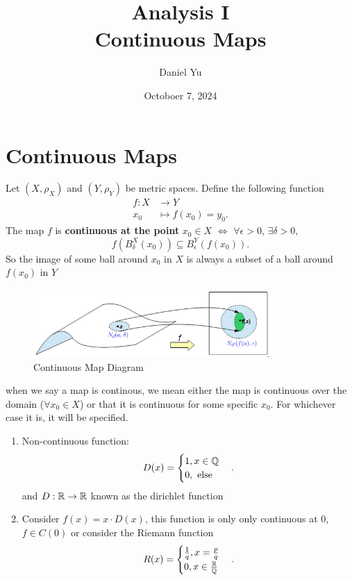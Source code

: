 \documentclass[a4paper]{article}
\title{\Huge{Analysis I}\\ Continuous Maps}
\author{\huge{Daniel Yu}}
\date{Octoboer 7, 2024}
\begin{document}
\maketitle
\newpage%
\tableofcontents
\pagebreak
  
\section{Continuous Maps}
\begin{definition}
 Let $\left( X, \rho_X \right) $ and $\left( Y, \rho_Y \right) $ be metric spaces. Define the following function
 \begin{align*}
   f: X &\longrightarrow Y \\
   x_0 &\longmapsto f(x_0) = y_0 
 .\end{align*}
 The map $f$ is \textbf{continuous at the point} $x_0 \in X$  $\iff$ $\forall \epsilon > 0$,  $\exists \delta > 0,$ 
 \[
 f\left( B_{\delta}^{X}(x_0) \right) \subseteq B_{\epsilon}^{Y} (f(x_0))
 .\]
 So the image of some ball around $x_0$ in $X$ is always a subset of a ball around $f(x_0)$ in $Y$
\end{definition}

\begin{figure}[h]
  \centering
  \includegraphics[width=0.8\textwidth]{assets/continuous_map_diagram.png}
  \caption{Continuous Map Diagram}
  \label{fig:continuous_map_diagram}
\end{figure}

\begin{note}
  when we say a map is continous, we mean either the map is continuous over the domain ($\forall x_0 \in X$) or that it is continuous for some specific $x_0$. For whichever case it is, it will be specified.
  \begin{enumerate}
    \item Non-continuous function: 
      \[
      D(x) = \begin{cases}
        1, x \in \mathbb{Q} \\
        0, \text{ else} 
      \end{cases}
      .\] 
      and $D: \mathbb{R} \to \mathbb{R}$ known as the dirichlet function
    \item Consider $f(x) = x \cdot D(x)$, this function is only only continuous at 0, $f \in C(0)$ or consider the Riemann function 
      \[
      R(x) = \begin{cases}
        \frac{1}{q}, x = \frac{p}{q} \\
        0, x \in \frac{\mathbb{R}}{\mathbb{Q}}
      \end{cases}
      .\] 
  \end{enumerate}
\end{note}
\end{document}
